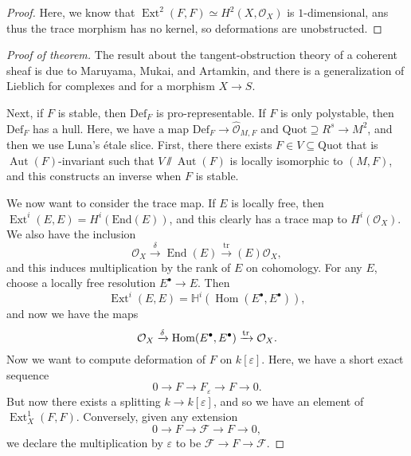 \documentclass[leqno, openany]{memoir}
\theoremstyle{definition}
\theoremstyle{remark}
\theoremstyle{plain}
\theoremstyle{definition}
\theoremstyle{remark}
\newcommand{\ep}{\varepsilon}
\newcommand{\mc}[1]{\mathcal{#1}}
\newcommand{\mr}[1]{\mathrm{#1}}
\newcommand{\wh}[1]{\widehat{#1}}
\DeclareMathOperator{\Hom}{Hom}
\DeclareMathOperator{\End}{End}
\DeclareMathOperator{\Aut}{Aut}
\DeclareMathOperator{\Ext}{Ext}
\begin{document}
\begin{proof}
    Here, we know that $\Ext^2(F ,F) \simeq H^2(X, \mc{O}_X)$ is $1$-dimensional, ans thus the trace morphism has no kernel, so deformations are unobstructed.
\end{proof}

\begin{proof}[Proof of theorem]
The result about the tangent-obstruction theory of a coherent sheaf is due to Maruyama, Mukai, and Artamkin, and there is a generalization of Lieblich for complexes and for a morphism $X \to S$. 

Next, if $F$ is stable, then $\mr{Def}_F$ is pro-representable. If $F$ is only polystable, then $\mr{Def}_F$ has a hull. Here, we have a map $\mr{Def}_F \to \wh{\mc{O}}_{M, F}$ and $\mr{Quot} \supseteq R^s \to M^2$, and then we use Luna's \'etale slice. First, there there exists $F \in V \subseteq \mr{Quot}$ that is $\Aut(F)$-invariant such that $V \sslash \Aut(F)$ is locally isomorphic to $(M, F)$, and this constructs an inverse when $F$ is stable.

We now want to consider the trace map. If $E$ is locally free, then $\Ext^i(E, E) = H^i(\mr{End}(E))$, and this clearly has a trace map to $H^i(\mc{O}_X)$. We also have the inclusion
\[ \mc{O}_X \xrightarrow{\delta} \End(E) \xrightarrow{\mr{tr}}(E) \mc{O}_X, \]
and this induces multiplication by the rank of $E$ on cohomology. For any $E$, choose a locally free resolution $E^{\bullet} \to E$. Then
\[ \Ext^i(E, E) = \mathbb{H}^i(\Hom(E^{\bullet}, E^{\bullet})), \]
and now we have the maps
\[ \mc{O}_X \xrightarrow{\delta} \Hom(E^{\bullet}, E^{\bullet}) \xrightarrow{\tr} \mc{O}_X. \]
Now we want to compute deformation of $F$ on $k[\ep]$. Here, we have a short exact sequence
\[ 0 \to F \to F_{\ep} \to F \to 0. \]
But now there exists a splitting $k \to k[\ep]$, and so we have an element of $\Ext^1_X(F, F)$. Conversely, given any extension
\[ 0 \to F \to \mc{F} \to F \to 0, \]
we declare the multiplication by $\ep$ to be $\mc{F} \to F \to \mc{F}$.


\end{proof}
\end{document}
